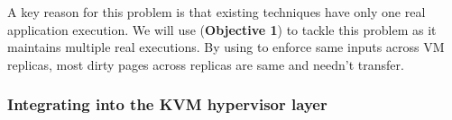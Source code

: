 A key reason for this problem is that existing techniques have only one real 
application execution. We will use \falcon (\textbf{Objective 1}) to tackle 
this problem as it maintains multiple real executions. By using \falcon to 
enforce same inputs across VM replicas, most dirty pages across replicas are 
same and needn't transfer.







% 



\vspace{-.15in}\subsubsection{Integrating \falcon into the KVM hypervisor 
layer} 
\label{sec:vm-arch}\vspace{-.075in}









